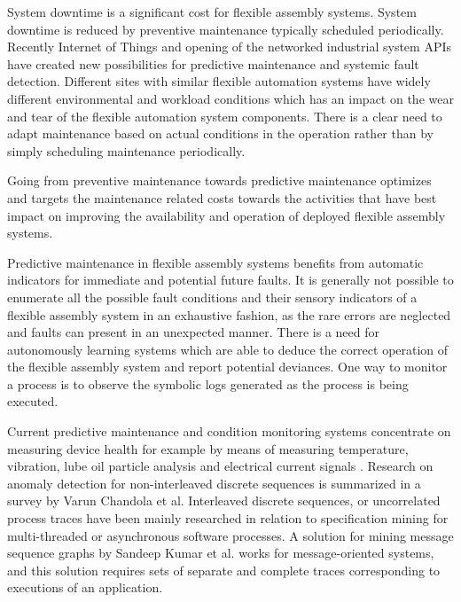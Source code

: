 \documentclass[procedia]{easychair}
\begin{document}
System downtime is a significant cost for flexible assembly systems. System downtime is reduced by preventive maintenance typically scheduled periodically.
Recently Internet of Things and opening of the networked industrial system APIs have created new possibilities for predictive maintenance and systemic fault detection. Different sites with similar
flexible automation systems have widely different environmental and workload conditions which has an impact on the wear and tear of the flexible automation system components.
There is a clear need to adapt maintenance based on actual conditions in the operation rather than by simply scheduling maintenance periodically\cite{hashemian2011state}.

Going from preventive maintenance towards predictive maintenance optimizes and targets the maintenance related costs towards the activities that have best impact
on improving the availability and operation of deployed flexible assembly systems.

Predictive maintenance in flexible assembly systems benefits from automatic indicators for immediate and potential future faults.
It is generally not possible to enumerate all the possible fault conditions and their sensory indicators of a flexible assembly system in an exhaustive fashion,
as the rare errors are neglected and faults can present in an unexpected manner\cite{camarinha1996integration}.
There is a need for autonomously learning systems which are able to deduce the correct operation of the flexible assembly system and report potential deviances. One way to monitor a process is to observe the symbolic
logs generated as the process is being executed.

Current predictive maintenance and condition monitoring systems concentrate on measuring device health for example by means of measuring temperature\cite{mobley2002introduction},
vibration\cite{scheffer2004practical}, lube oil particle analysis\cite{hunt1993handbook} and electrical current signals
\cite{thomson2001current}. Research on anomaly detection for non-interleaved discrete sequences is summarized in a survey by Varun Chandola et al.\cite{chandola2012anomaly}
Interleaved discrete sequences, or uncorrelated process traces have been mainly researched in relation to specification mining for multi-threaded or asynchronous software processes.
A solution for mining message sequence graphs by Sandeep Kumar et al.\cite{kumar2011mining} works for message-oriented systems,
and this solution requires sets of separate and complete traces corresponding to executions of an application\cite{mining-program-workflow-from-interleaved-traces}.
\end{document}
